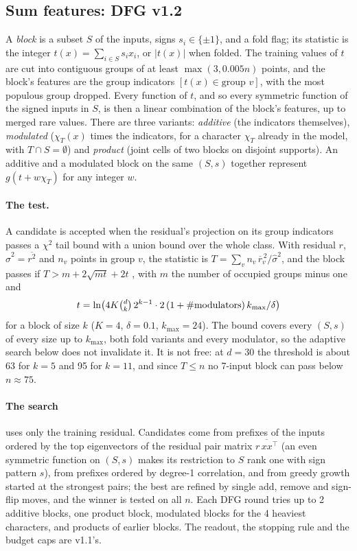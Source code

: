 \subsection{Sum features: DFG v1.2}\label{sec:sumfeat}

A \emph{block} is a subset $S$ of the inputs, signs $s_i\in\{\pm1\}$, and a fold flag; its statistic is the integer $t(x)=\sum_{i\in S}s_ix_i$, or $|t(x)|$ when folded. The training values of $t$ are cut into contiguous groups of at least $\max(3,0.005n)$ points, and the block's features are the group indicators $[t(x)\in\text{group }v]$, with the most populous group dropped. Every function of $t$, and so every symmetric function of the signed inputs in $S$, is then a linear combination of the block's features, up to merged rare values. There are three variants: \emph{additive} (the indicators themselves), \emph{modulated} ($\chi_T(x)$ times the indicators, for a character $\chi_T$ already in the model, with $T\cap S=\emptyset$) and \emph{product} (joint cells of two blocks on disjoint supports). An additive and a modulated block on the same $(S,s)$ together represent $g(t+w\chi_T)$ for any integer $w$.

\paragraph{The test.} A candidate is accepted when the residual's projection on its group indicators passes a $\chi^2$ tail bound with a union bound over the whole class. With residual $r$, $\hat\sigma^2=\overline{r^2}$ and $n_v$ points in group $v$, the statistic is $T=\sum_v n_v\,\overline{r}_v^{\,2}/\hat\sigma^2$, and the block passes if $T>m+2\sqrt{mt}+2t$ \cite{laurent2000adaptive}, with $m$ the number of occupied groups minus one and
\[
t=\ln\bigl(4K\tbinom{d}{k}\,2^{k-1}\cdot2\,(1+\#\text{modulators})\,k_{\max}/\delta\bigr)
\]
for a block of size $k$ ($K=4$, $\delta=0.1$, $k_{\max}=24$). The bound covers every $(S,s)$ of every size up to $k_{\max}$, both fold variants and every modulator, so the adaptive search below does not invalidate it. It is not free: at $d=30$ the threshold is about 63 for $k=5$ and 95 for $k=11$, and since $T\le n$ no 7-input block can pass below $n\approx75$.

\paragraph{The search} uses only the training residual. Candidates come from prefixes of the inputs ordered by the top eigenvectors of the residual pair matrix $\overline{r\,xx^\top}$ (an even symmetric function on $(S,s)$ makes its restriction to $S$ rank one with sign pattern $s$), from prefixes ordered by degree-1 correlation, and from greedy growth started at the strongest pairs; the best are refined by single add, remove and sign-flip moves, and the winner is tested on all $n$. Each DFG round tries up to 2 additive blocks, one product block, modulated blocks for the 4 heaviest characters, and products of earlier blocks. The readout, the stopping rule and the budget caps are v1.1's.

